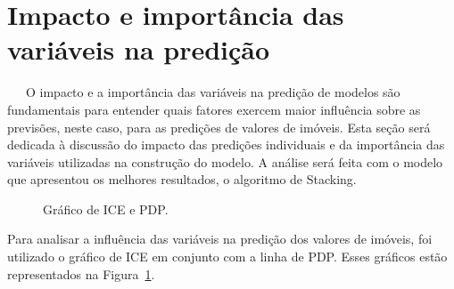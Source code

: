 \documentclass[
  12pt,
  a4paper,
]{scrreprt}
\begin{document}
\section{Impacto e importância das variáveis na
predição}\label{impacto-e-importuxe2ncia-das-variuxe1veis-na-prediuxe7uxe3o}

~~~O impacto e a importância das variáveis na predição de modelos são
fundamentais para entender quais fatores exercem maior influência sobre
as previsões, neste caso, para as predições de valores de imóveis. Esta
seção será dedicada à discussão do impacto das predições individuais e
da importância das variáveis utilizadas na construção do modelo. A
análise será feita com o modelo que apresentou os melhores resultados, o
algoritmo de Stacking.

\begin{figure}


\caption{\label{fig-ice_pdp}Gráfico de ICE e PDP.}

\end{figure}%

\vspace{12pt}

Para analisar a influência das variáveis na predição dos valores de
imóveis, foi utilizado o gráfico de ICE em conjunto com a linha de PDP.
Esses gráficos estão representados na Figura~\ref{fig-ice_pdp}.
\end{document}
